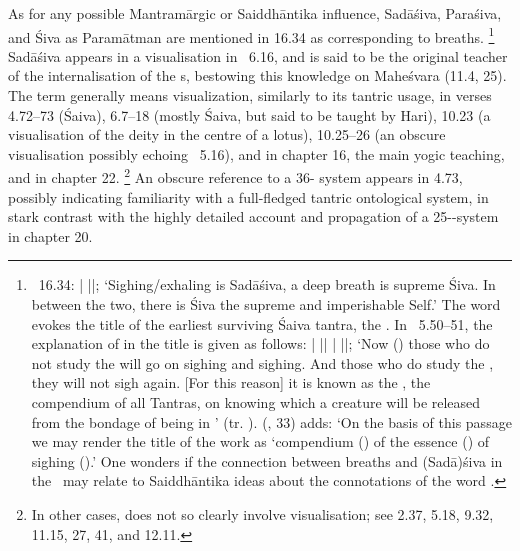 As for any possible Mantramārgic or Saiddhāntika influence, Sadāśiva, Paraśiva, and Śiva as Paramātman are mentioned in 16.34 as corresponding to breaths.%
		\footnote{\VSS\ 16.34: 
						 |
		 ||;						
        `Sighing/exhaling is Sadāśiva, a deep breath is 
        supreme Śiva. In between the two, there is Śiva the 	
        supreme and imperishable Self.'
        The word  evokes the title of 
        the earliest surviving Śaiva tantra, the \Nisv.
        In \Nisvuttara\ 5.50--51, the explanation of
         in the title is given as follows:
         |
		 ||
		 |
		 ||;
        `Now () those who do not study 
        the  will go on sighing and sighing.
        And those who do study the , 
        they will not sigh again. [For this reason] it is known
         as the , the compendium of all Tantras, 
         on knowing which a creature will be released from 
         the bondage of being in ' 
         (tr. ).  
         \citeauthor{KafleNisvasaBook} 	
         (\citeyear{KafleNisvasaBook}, {33}) adds:
         `On the basis of this passage we may render 
         the title of the work as `compendium () 	
         of the essence () of sighing ().'
		   One wonders if the connection between breaths
		   and (Sadā)śiva in the \VSS\ may relate to 
		   Saiddhāntika ideas about the connotations
		   of the word .}
Sadāśiva appears in a visualisation in \VSS\ 6.16, and is said to be the original teacher of the internalisation of the s, bestowing this knowledge on Maheśvara (11.4, 25).
The term  generally means visualization, similarly to its tantric usage, in verses 4.72--73 (Śaiva), 6.7--18 (mostly Śaiva, but said to be taught by Hari), 
10.23 (a visualisation of the deity in the centre of a lotus), 
10.25--26 (an obscure visualisation possibly echoing \Nisvuttara\ 5.16), and in chapter 16, the main yogic teaching, and in chapter 22.%
		\footnote{In other cases,  does 
		not so clearly involve visualisation; see        
        2.37, 5.18, 9.32, 11.15, 27, 41, and 12.11.}
An obscure reference to a 36- system appears in 4.73, possibly indicating familiarity with a full-fledged tantric ontological system, in stark contrast with the highly detailed account and propagation of a 25--system in chapter 20.%
